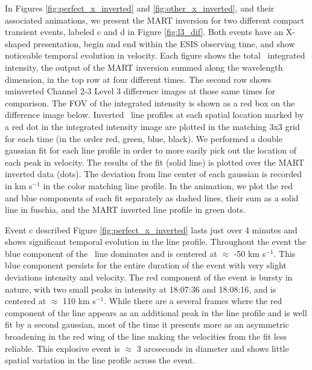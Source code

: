     	In Figures \ref{fig:perfect_x_inverted} and \ref{fig:other_x_inverted}, and their associated animations, we present the MART inversion for two different compact transient events, labeled c and d in Figure \ref{fig:l3_dif}.
    	Both events have an X-shaped presentation, begin and end within the ESIS observing time, and show noticeable temporal evolution in velocity.
		Each figure shows the total \ov \ integrated intensity, the output of the MART inversion summed along the wavelength dimension, in the top row  at four different times. 
		The second row shows uninverted Channel 2-3 Level 3 difference images at those same times for comparison.
		The FOV of the integrated intensity is shown as a red box on the difference image below. 
		Inverted \ov \ line profiles at each spatial location marked by a red dot in the integrated intensity image are plotted in the matching 3x3 grid for each time (in the order red, green, blue, black).
		We performed a double gaussian fit for each line profile in order to more easily pick out the location of each peak in velocity.
		The results of the fit (solid line) is plotted over the MART inverted data (dots).
		The deviation from line center of each gaussian is recorded in km s$^{-1}$ in the color matching line profile.
		In the animation, we plot the red and blue components of each fit separately as dashed lines, their sum as a solid line in fuschia, and the MART inverted line profile in  green dots.
		
		Event c described Figure \ref{fig:perfect_x_inverted} lasts just over 4 minutes and shows significant temporal evolution in the line profile.
		Throughout the event the blue component of the \ov \ line dominates and is centered at $\approx$ -50 km s$^{-1}$.
		This blue component persists for the entire duration of the event with very slight deviations intensity and velocity.
		The red component of the event is bursty in nature, with two small peaks in intensity at 18:07:36 and 18:08:16, and is centered at $\approx$ 110 km s$^{-1}$.
		While there are a several frames where the red component of the line appears as an additional peak in the line profile and is well fit by a second gaussian, most of the time it presents more as an asymmetric broadening in the red wing of the line making the velocities from the fit less reliable.
		This explosive event is $\approx$ 3 arcseconds in diameter and shows little spatial variation in the line profile across the event.
		
